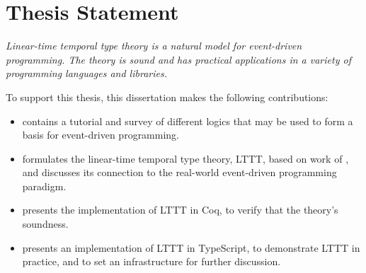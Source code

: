 \section{Thesis Statement}
\textit{Linear-time temporal type theory is a natural model for event-driven programming. The theory is sound and has practical applications in a variety of programming languages and libraries.}

To support this thesis, this dissertation makes the following contributions:

\begin{itemize}
    \item {} contains a tutorial and survey of different logics that may be used to form a basis for event-driven programming.
    \item {} formulates the linear-time temporal type theory, LTTT, based on work of \cite{Paykin2016TheEO}, and discusses its connection to the real-world event-driven programming paradigm.
    \item {} presents the implementation of LTTT in Coq, to verify that the theory's soundness.
    \item {} presents an implementation of LTTT in TypeScript, to demonstrate LTTT in practice, and to set an infrastructure for further discussion.
\end{itemize}